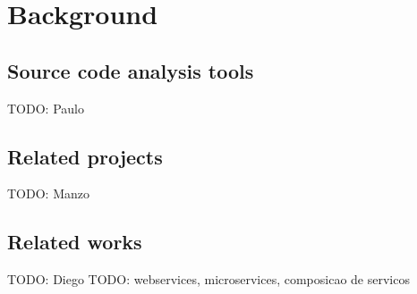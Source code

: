\section{Background}
\label{sec:background}

\subsection{Source code analysis tools}
\label{subsec:related-tools}

TODO: Paulo

\subsection{Related projects}
\label{subsec:related-projects}

TODO: Manzo

\subsection{Related works}
\label{sec:related-works}

TODO: Diego
TODO: webservices, microservices, composicao de servicos

